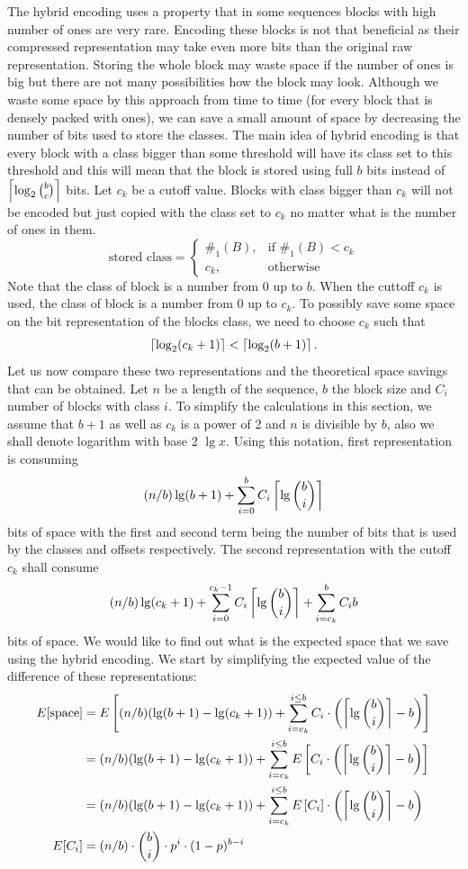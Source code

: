 The hybrid encoding uses a property that in some sequences blocks with high number
of ones are very rare. Encoding these blocks is not that beneficial as their
compressed representation may take even more bits than the original raw
representation. Storing the whole block may waste space if the number of
ones is big but there are not many possibilities how the block may look.
Although we waste some space by this approach from time to time (for every
block that is densely packed with ones), we can save a small amount of space
by decreasing the number of bits used to store the classes. The main idea
of hybrid encoding is that every block with a class bigger than some threshold
will have its class set to this threshold and this will mean that the block
is stored using full $b$ bits instead of $\left\lceil \log_2{b\choose c} \right\rceil$ bits.
Let $c_k$ be a cutoff value. Blocks with class bigger than $c_k$ will not be
encoded but just copied with the class set to $c_k$ no matter what is the
number of ones in them.
\[
    \text{stored class} = 
\begin{cases}
    \#_1(B),& \text{if } \#_1(B) < c_k\\
    c_k,              & \text{otherwise}
\end{cases}
\]
Note that the class of block is a number from 0 up to $b$. When the cuttoff $c_k$ is
used, the class of block is a number from 0 up to $c_k$. To possibly save some space on the bit representation
of the blocks class, we need to choose $c_k$ such that $$\left\lceil \log_2(c_k+1) \right\rceil < \left\lceil \log_2(b+1) \right\rceil.$$
Let us now compare these two representations and the theoretical space savings that
can be obtained. Let $n$ be a length of the sequence, $b$ the block size and $C_i$
number of blocks with class $i$. To simplify the calculations in this section, we
assume that $b+1$ as well as $c_k$ is a power of 2 and $n$ is divisible by $b$, also
we shall denote logarithm with base 2 $\lg x$. Using this notation, first representation
is consuming $$(n/b)\lg (b+1) + \sum_{i=0}^{b} C_i\left\lceil \lg {b\choose i} \right\rceil$$
bits of space with the first and second term being the number of bits that
is used by the classes and offsets respectively. The second representation
with the cutoff $c_k$ shall consume $$(n/b)\lg (c_k+1) + \sum_{i=0}^{c_k-1}C_i\left\lceil \lg {b\choose i} \right\rceil + \sum_{i=c_k}^{b}C_i b$$
bits of space. We would like to find out what is the expected space that we save
using the hybrid encoding. We start by simplifying the expected value of the
difference of these representations:
\begin{align}
E[\text{space}] &= E\left[(n/b)(\lg(b+1)-\lg(c_k+1)) + \sum_{i=c_k}^{i\leq b}C_i\cdot \left(\left\lceil \lg{b\choose i} \right\rceil - b\right)\right] \nonumber\\
&=(n/b)(\lg(b+1)-\lg(c_k+1)) + \sum_{i=c_k}^{i\leq b}E\left[C_i\cdot \left(\left\lceil \lg{b\choose i} \right\rceil - b\right)\right] \nonumber\\
&=(n/b)(\lg(b+1)-\lg(c_k+1)) + \sum_{i=c_k}^{i\leq b}E\left[C_i\right]\cdot \left(\left\lceil \lg{b\choose i} \right\rceil - b\right) \nonumber\\
E[C_i] &= (n/b)\cdot {b\choose i}\cdot p^i\cdot (1-p)^{b-i} \label{eq:hybrid_encoding_expected_c_i}
\end{align}

